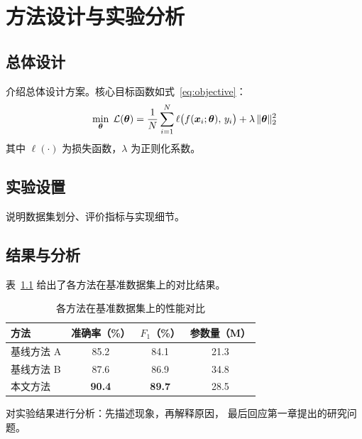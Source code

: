 \chapter{方法设计与实验分析}

\section{总体设计}
介绍总体设计方案。核心目标函数如式~\eqref{eq:objective}：
\begin{equation}
  \min_{\boldsymbol{\theta}} \;
  \mathcal{L}(\boldsymbol{\theta}) =
  \frac{1}{N} \sum_{i=1}^{N}
  \ell \bigl( f(\boldsymbol{x}_i; \boldsymbol{\theta}),\, y_i \bigr)
  + \lambda \, \lVert \boldsymbol{\theta} \rVert_2^2
  \label{eq:objective}
\end{equation}
其中 $\ell(\cdot)$ 为损失函数，$\lambda$ 为正则化系数。

\section{实验设置}
说明数据集划分、评价指标与实现细节。

\section{结果与分析}
表~\ref{tab:compare} 给出了各方法在基准数据集上的对比结果。

\begin{table}[!htbp]
  \centering
  \caption{各方法在基准数据集上的性能对比}
  \label{tab:compare}
  \begin{tabular}{lccc}
    \toprule
    方法 & 准确率（\%） & $F_1$（\%） & 参数量（M） \\
    \midrule
    基线方法 A & 85.2 & 84.1 & 21.3 \\
    基线方法 B & 87.6 & 86.9 & 34.8 \\
    本文方法   & \textbf{90.4} & \textbf{89.7} & 28.5 \\
    \bottomrule
  \end{tabular}
\end{table}


对实验结果进行分析：先描述现象，再解释原因，
最后回应第一章提出的研究问题。
